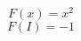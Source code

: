 \documentclass{article}
\begin{document}
\begin{equation} F(x) = x^2 \end{equation}
\begin{equation} F(I) = -1 \end{equation}
\end{document}
